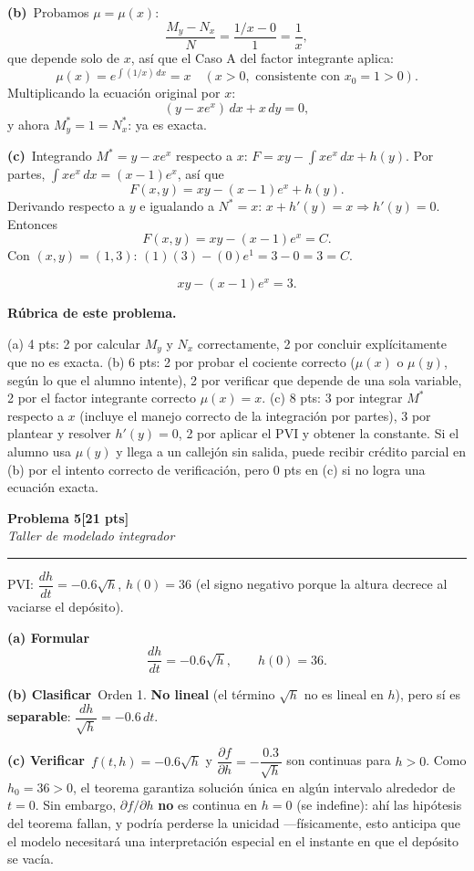 \documentclass[11pt,letterpaper]{article}
\newcommand{\problema}[3]{%
  \bigskip\bigskip\noindent
  {\Large\textbf{Problema #1}}\hfill\textbf{[#2 pts]}\\[3pt]
  {\small\itshape #3}\par
  \vspace{2pt}\hrule\vspace{8pt}
}
\newcommand{\subparte}[2]{%
  \medskip\noindent\textbf{(#1}\ #2\par\smallskip
}
\newenvironment{resultado}
  {\begin{mdframed}[linecolor=black,linewidth=0.6pt,
    innerleftmargin=6pt,innerrightmargin=6pt,innertopmargin=4pt,innerbottommargin=4pt]
   \bfseries}
  {\end{mdframed}}
\newenvironment{rubrica}{%
  \begin{mdframed}[linecolor=black,linewidth=0.6pt,
    innerleftmargin=8pt,innerrightmargin=8pt,innertopmargin=5pt,innerbottommargin=5pt]
  \small\textbf{Rúbrica de este problema.}\par\smallskip
}{\end{mdframed}}
\begin{document}
\subparte{b)}{Probamos $\mu=\mu(x)$:
\[
\frac{M_y-N_x}{N} = \frac{1/x - 0}{1} = \frac{1}{x},
\]
que depende solo de $x$, así que el Caso A del factor integrante aplica:
\[
\mu(x) = e^{\int (1/x)\,dx} = x \quad (x>0, \text{ consistente con } x_0=1>0).
\]
Multiplicando la ecuación original por $x$:
\[
(y-xe^x)\, dx + x\, dy = 0,
\]
y ahora $M^*_y = 1 = N^*_x$: \checkmark ya es exacta.}

\subparte{c)}{Integrando $M^*=y-xe^x$ respecto a $x$: $F = xy - \displaystyle\int xe^x\,dx + h(y)$. Por partes, $\int xe^x\,dx = (x-1)e^x$, así que
\[
F(x,y) = xy - (x-1)e^x + h(y).
\]
Derivando respecto a $y$ e igualando a $N^*=x$: $x + h'(y) = x \Rightarrow h'(y)=0$. Entonces
\[
F(x,y) = xy - (x-1)e^x = C.
\]
Con $(x,y)=(1,3)$: $(1)(3) - (0)e^1 = 3 - 0 = 3 = C$.
\begin{resultado}
\[
xy - (x-1)e^x = 3.
\]
\end{resultado}}

\begin{rubrica}
(a) 4 pts: 2 por calcular $M_y$ y $N_x$ correctamente, 2 por concluir explícitamente que no es exacta. (b) 6 pts: 2 por probar el cociente correcto ($\mu(x)$ o $\mu(y)$, según lo que el alumno intente), 2 por verificar que depende de una sola variable, 2 por el factor integrante correcto $\mu(x)=x$. (c) 8 pts: 3 por integrar $M^*$ respecto a $x$ (incluye el manejo correcto de la integración por partes), 3 por plantear y resolver $h'(y)=0$, 2 por aplicar el PVI y obtener la constante. Si el alumno usa $\mu(y)$ y llega a un callejón sin salida, puede recibir crédito parcial en (b) por el intento correcto de verificación, pero 0 pts en (c) si no logra una ecuación exacta.
\end{rubrica}

\problema{5}{21}{Taller de modelado integrador}

PVI: $\dfrac{dh}{dt} = -0.6\sqrt{h}$, $h(0)=36$ (el signo negativo porque la altura decrece al vaciarse el depósito).

\subparte{a) Formular}{
\[
\frac{dh}{dt} = -0.6\sqrt{h}, \qquad h(0)=36.
\]
}

\subparte{b) Clasificar}{Orden 1. \textbf{No lineal} (el término $\sqrt{h}$ no es lineal en $h$), pero sí es \textbf{separable}: $\dfrac{dh}{\sqrt{h}} = -0.6\,dt$.}

\subparte{c) Verificar}{$f(t,h)=-0.6\sqrt{h}$ y $\dfrac{\partial f}{\partial h} = -\dfrac{0.3}{\sqrt{h}}$ son continuas para $h>0$. Como $h_0=36>0$, el teorema garantiza solución única en algún intervalo alrededor de $t=0$. Sin embargo, $\partial f/\partial h$ \textbf{no} es continua en $h=0$ (se indefine): ahí las hipótesis del teorema fallan, y podría perderse la unicidad —físicamente, esto anticipa que el modelo necesitará una interpretación especial en el instante en que el depósito se vacía.}
\end{document}
